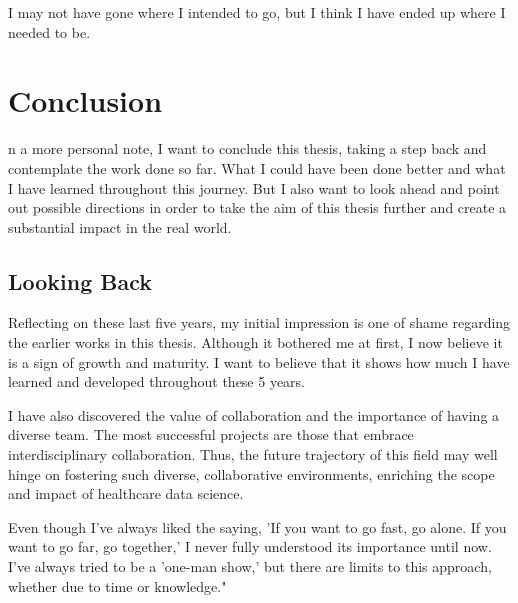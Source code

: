 

\begin{savequote}[75mm]
I may not have gone where I intended to go,
but I think I have ended up where I needed to be.

\end{savequote}

\chapter{Conclusion} \label{chap:conclusion}
n a more personal note, I want to conclude this thesis, taking a step back and contemplate the work done so far. What I could have been done better and what I have learned throughout this journey.
But I also want to look ahead and point out possible directions in order to take the aim of this thesis further and create a substantial impact in the real world.

\section{Looking Back}
Reflecting on these last five years, my initial impression is one of shame regarding the earlier works in this thesis. Although it bothered me at first, I now believe it is a sign of growth and maturity. I want to believe that it shows how much I have learned and developed throughout these 5 years.

I have also discovered the value of collaboration and the importance of having a diverse team. The most successful projects are those that embrace interdisciplinary collaboration. Thus, the future trajectory of this field may well hinge on fostering such diverse, collaborative environments, enriching the scope and impact of healthcare data science.

Even though I've always liked the saying, 'If you want to go fast, go alone. If you want to go far, go together,' I never fully understood its importance until now. I've always tried to be a 'one-man show,' but there are limits to this approach, whether due to time or knowledge." \\

